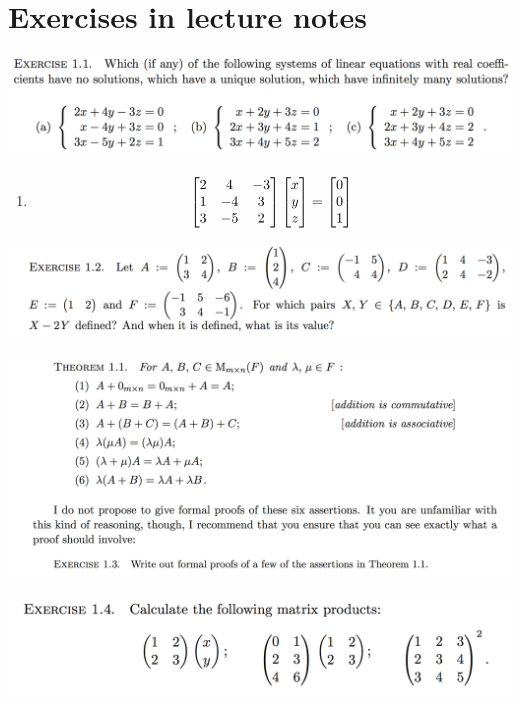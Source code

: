 \documentclass[12pt]{article}
\begin{document}
\section{Exercises in lecture notes}

\begin{mdframed}
\includegraphics[width=400pt]{img/oxford-prelims-M1-linear-algebra-1-1.png}
\end{mdframed}
\begin{enumerate}[label=(\alph*)]
\item
  \begin{align*}
    \begin{bmatrix}2 & 4 & -3\\1 & -4 & 3\\3 & -5 & 2\\ \end{bmatrix} \begin{bmatrix}x\\y\\z\end{bmatrix} = \begin{bmatrix}0\\0\\1\end{bmatrix}\\
  \end{align*}
\end{enumerate}

\begin{mdframed}
\includegraphics[width=400pt]{img/oxford-prelims-M1-linear-algebra-1-2.png}
\end{mdframed}

\begin{mdframed}
\includegraphics[width=400pt]{img/oxford-prelims-M1-linear-algebra-1-3.png}
\end{mdframed}

\begin{mdframed}
\includegraphics[width=400pt]{img/oxford-prelims-M1-linear-algebra-1-4.png}
\end{mdframed}
\end{document}
